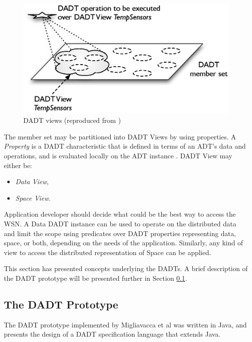 \begin{figure}[h]
\centering
\includegraphics[scale=0.75]{img/DADT_Views.eps} 
\caption[DADT Views]{DADT views (reproduced from \cite{migliavacca_DADT:2006})}
\label{Fig:DADT_Views}
\end{figure}

The member set may be partitioned into DADT Views by using properties. A
\emph{Property} is a DADT characteristic that is defined in terms of an ADT's
data and operations, and is evaluated locally on the ADT instance
\cite{migliavacca_DADT:2006}. DADT View may either be:
\begin{itemize}
  \item \emph{Data View},
  \item \emph{Space View}.
\end{itemize}

Application developer should decide what could be the best
way to access the WSN. A Data DADT instance can be used to
operate on the distributed data and limit the scope using predicates over
DADT properties representing data, space, or both,
depending on the needs of the application. Similarly, any kind of view to
access the distributed representation of Space can be applied.

This section has presented concepts underlying the DADTs. A brief description
of the DADT prototype \cite{migliavacca_DADT:2006} will be presented further in
Section \ref{sec:DADTPrototype}.

\subsection {The DADT Prototype} \label{sec:DADTPrototype}

The DADT prototype implemented by Migliavacca et al \cite{migliavacca_DADT:2006}
was written in Java, and presents the design of a DADT specification language
that extends Java.

